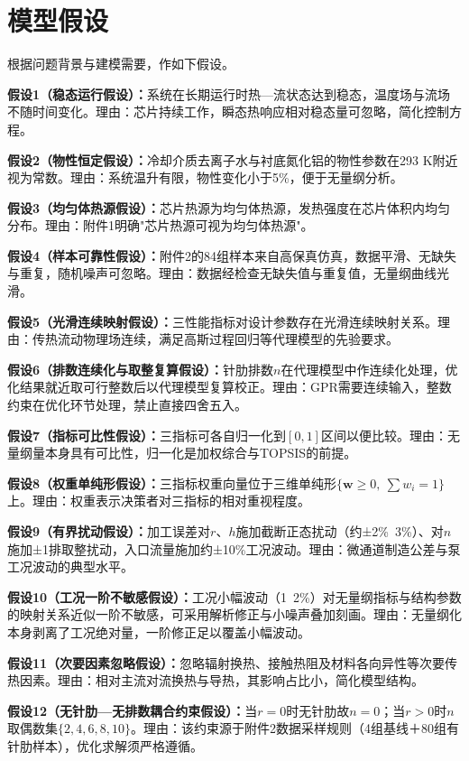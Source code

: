 \documentclass[withoutpreface]{cumcmthesis}
\begin{document}
\section{模型假设}
根据问题背景与建模需要，作如下假设。

\textbf{假设1（稳态运行假设）：}系统在长期运行时热—流状态达到稳态，温度场与流场不随时间变化。理由：芯片持续工作，瞬态热响应相对稳态量可忽略，简化控制方程。

\textbf{假设2（物性恒定假设）：}冷却介质去离子水与衬底氮化铝的物性参数在293 K附近视为常数。理由：系统温升有限，物性变化小于5\%，便于无量纲分析。

\textbf{假设3（均匀体热源假设）：}芯片热源为均匀体热源，发热强度在芯片体积内均匀分布。理由：附件1明确"芯片热源可视为均匀体热源"。

\textbf{假设4（样本可靠性假设）：}附件2的84组样本来自高保真仿真，数据平滑、无缺失与重复，随机噪声可忽略。理由：数据经检查无缺失值与重复值，无量纲曲线光滑。

\textbf{假设5（光滑连续映射假设）：}三性能指标对设计参数存在光滑连续映射关系。理由：传热流动物理场连续，满足高斯过程回归等代理模型的先验要求。

\textbf{假设6（排数连续化与取整复算假设）：}针肋排数$n$在代理模型中作连续化处理，优化结果就近取可行整数后以代理模型复算校正。理由：GPR需要连续输入，整数约束在优化环节处理，禁止直接四舍五入。

\textbf{假设7（指标可比性假设）：}三指标可各自归一化到$[0,1]$区间以便比较。理由：无量纲量本身具有可比性，归一化是加权综合与TOPSIS的前提。

\textbf{假设8（权重单纯形假设）：}三指标权重向量位于三维单纯形$\{\mathbf{w}\geq0,\ \sum w_i=1\}$上。理由：权重表示决策者对三指标的相对重视程度。

\textbf{假设9（有界扰动假设）：}加工误差对$r$、$h$施加截断正态扰动（约±2\%~3\%）、对$n$施加±1排取整扰动，入口流量施加约±10\%工况波动。理由：微通道制造公差与泵工况波动的典型水平。

\textbf{假设10（工况一阶不敏感假设）：}工况小幅波动（1~2\%）对无量纲指标与结构参数的映射关系近似一阶不敏感，可采用解析修正与小噪声叠加刻画。理由：无量纲化本身剥离了工况绝对量，一阶修正足以覆盖小幅波动。

\textbf{假设11（次要因素忽略假设）：}忽略辐射换热、接触热阻及材料各向异性等次要传热因素。理由：相对主流对流换热与导热，其影响占比小，简化模型结构。

\textbf{假设12（无针肋—无排数耦合约束假设）：}当$r=0$时无针肋故$n=0$；当$r>0$时$n$取偶数集$\{2,4,6,8,10\}$。理由：该约束源于附件2数据采样规则（4组基线＋80组有针肋样本），优化求解须严格遵循。
\end{document}
